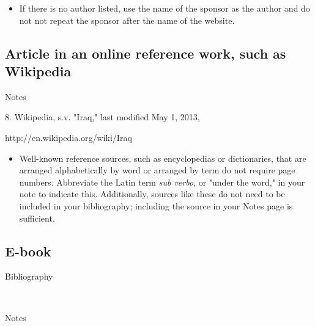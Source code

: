 \begin{itemize}\item If there is no author listed, use the name of the sponsor
as the author and do not  not repeat the sponsor after the name of the
website.\end{itemize}

\subsection{Article in an online reference work, such as Wikipedia}

\begin{center}{Notes}\end{center} 
\begin{singlespace}
\noindent\hspace{1.2cm}8. Wikipedia, s.v.
"Iraq," last modified May 1, 2013,

http://en.wikipedia.org/wiki/Iraq
\end{singlespace}


\begin{itemize}\item Well-known reference sources, such as encyclopedias or
dictionaries, that are arranged alphabetically by word or arranged by term do
not require page numbers. Abbreviate
the Latin term \emph{sub verbo}, or "under the word," in your note to indicate
this. Additionally, sources like these do not need to be included in your bibliography; including the source in your Notes page is sufficient. \end{itemize}

\subsection{E-book} \begin{center}{Bibliography}\end{center}

\begin{singlespace}
\noindent{}\\

\noindent{}
\end{singlespace}

\begin{center}{Notes}\end{center}

